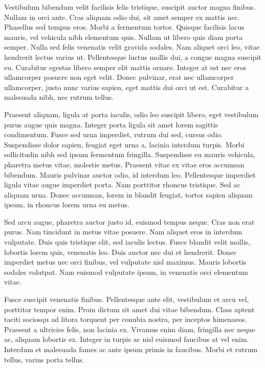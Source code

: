 \documentclass{article}
\begin{document}
Vestibulum bibendum velit facilisis felis tristique, suscipit auctor magna finibus. Nullam in orci ante. Cras aliquam odio dui, sit amet semper ex mattis nec. Phasellus sed tempus eros. Morbi a fermentum tortor. Quisque facilisis lacus mauris, vel vehicula nibh elementum quis. Nullam ut libero quis diam porta semper. Nulla sed felis venenatis velit gravida sodales. Nam aliquet orci leo, vitae hendrerit lectus varius ut. Pellentesque luctus mollis dui, a congue magna suscipit eu. Curabitur egestas libero semper elit mattis ornare. Integer at est nec eros ullamcorper posuere non eget velit. Donec pulvinar, erat nec ullamcorper ullamcorper, justo nunc varius sapien, eget mattis dui orci ut est. Curabitur a malesuada nibh, nec rutrum tellus.

Praesent aliquam, ligula at porta iaculis, odio leo suscipit libero, eget vestibulum purus augue quis magna. Integer porta ligula sit amet lorem sagittis condimentum. Fusce sed urna imperdiet, rutrum dui sed, cursus odio. Suspendisse dolor sapien, feugiat eget urna a, lacinia interdum turpis. Morbi sollicitudin nibh sed ipsum fermentum fringilla. Suspendisse eu mauris vehicula, pharetra metus vitae, molestie metus. Praesent vitae ex vitae eros accumsan bibendum. Mauris pulvinar auctor odio, id interdum leo. Pellentesque imperdiet ligula vitae augue imperdiet porta. Nam porttitor rhoncus tristique. Sed ac aliquam urna. Donec accumsan, lorem in blandit feugiat, tortor sapien aliquam ipsum, in rhoncus lorem urna eu metus.

Sed arcu augue, pharetra auctor justo id, euismod tempus neque. Cras non erat purus. Nam tincidunt in metus vitae posuere. Nam aliquet eros in interdum vulputate. Duis quis tristique elit, sed iaculis lectus. Fusce blandit velit mollis, lobortis lorem quis, venenatis leo. Duis auctor nec dui et hendrerit. Donec imperdiet metus nec orci finibus, vel vulputate nisl maximus. Mauris lobortis sodales volutpat. Nam euismod vulputate ipsum, in venenatis orci elementum vitae.

Fusce suscipit venenatis finibus. Pellentesque ante elit, vestibulum et arcu vel, porttitor tempor enim. Proin dictum sit amet dui vitae bibendum. Class aptent taciti sociosqu ad litora torquent per conubia nostra, per inceptos himenaeos. Praesent a ultricies felis, non lacinia ex. Vivamus enim diam, fringilla nec neque ac, aliquam lobortis ex. Integer in turpis ac nisl euismod faucibus at vel enim. Interdum et malesuada fames ac ante ipsum primis in faucibus. Morbi et rutrum tellus, varius porta tellus.
\end{document}

